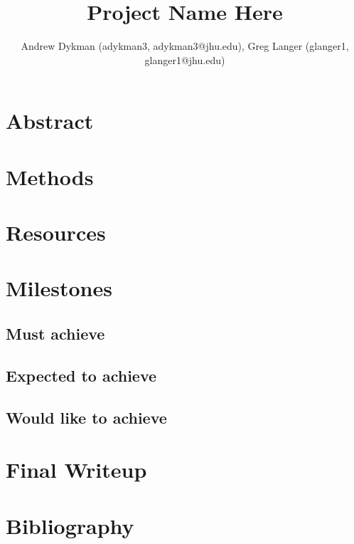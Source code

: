 \documentclass[11pt]{article}
\title{Project Name Here}
\author{Andrew Dykman (adykman3, adykman3@jhu.edu), Greg Langer (glanger1, glanger1@jhu.edu)}
\date{}
\begin{document}
\maketitle

\section{Abstract}


\section{Methods}

\section{Resources}

\section{Milestones}
\subsection{Must achieve}

\subsection{Expected to achieve}

\subsection{Would like to achieve}


\section{Final Writeup}

\section{Bibliography}
\end{document}
